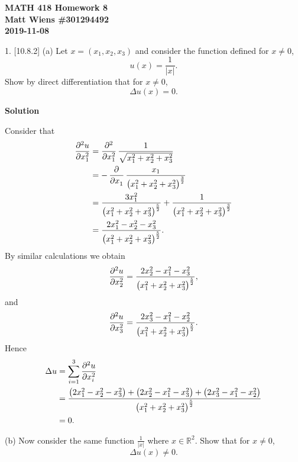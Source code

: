\documentclass{article}
\begin{document}
\textbf{MATH 418 Homework 8} \\
\textbf{Matt Wiens \#301294492} \\
\textbf{2019-11-08}

1. [10.8.2] (a) Let $x = (x_1, x_2, x_3)$ and consider the function
defined for $x \neq 0$,
%
\begin{equation*}
    u(x) = \frac{1}{|x|}
    .
\end{equation*}
%
Show by direct differentiation that for $x \neq 0$,
%
\begin{equation*}
    \Delta u(x) = 0
    .
\end{equation*}

\textbf{Solution}

Consider that
%
\begin{align*}
    \dpd[2]{u}{x_1}
        &= \dpd[2]{}{x_1} \frac{1}{\sqrt{x_1^2 + x_2^2 + x_3^2}} \\
        &= - \dpd{}{x_1} \frac{x_1}{\del{x_1^2 + x_2^2 + x_3^2}^\frac{3}{2}} \\
        &= \frac{3 x_1^2}{\del{x_1^2 + x_2^2 + x_3^2}^\frac{5}{2}}
           + \frac{1}{\del{x_1^2 + x_2^2 + x_3^2}^\frac{3}{2}} \\
        &= \frac{2 x_1^2 - x_2^2 - x_3^2}{\del{x_1^2 + x_2^2 + x_3^2}^\frac{5}{2}}
        .
\end{align*}
%
By similar calculations we obtain
%
\begin{equation*}
    \dpd[2]{u}{x_2}
        = \frac{2 x_2^2 - x_1^2 - x_3^2}{\del{x_1^2 + x_2^2 + x_3^2}^\frac{5}{2}}
    ,
\end{equation*}
%
and
%
\begin{equation*}
    \dpd[2]{u}{x_3}
        = \frac{2 x_3^2 - x_1^2 - x_2^2}{\del{x_1^2 + x_2^2 + x_3^2}^\frac{5}{2}}
    .
\end{equation*}
%
Hence
%
\begin{align*}
    \Delta u
        &= \sum_{i = 1}^3 \dpd[2]{u}{x_i} \\
        &= \frac{
            \del{2 x_1^2 - x_2^2 - x_3^2}
            + \del{2 x_2^2 - x_1^2 - x_3^2}
            + \del{2 x_3^2 - x_1^2 - x_2^2}
            }{\del{x_1^2 + x_2^2 + x_3^2}^\frac{5}{2}} \\
        &= 0
        .
\end{align*}

\vspace{5mm}

(b) Now consider the same function $\frac{1}{|x|}$ where $x \in
\mathbb{R}^2$. Show that for $x \neq 0$,
%
\begin{equation*}
    \Delta u(x) \neq 0
    .
\end{equation*}
\end{document}
